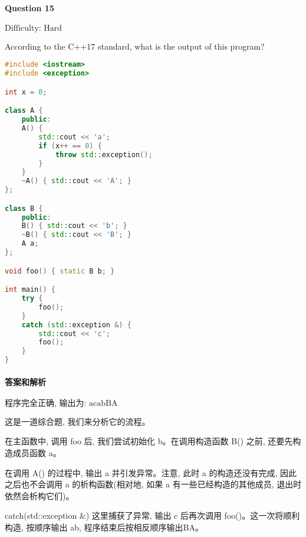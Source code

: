 \documentclass{article}
\begin{document}
	\paragraph*{Question 15} $\boxed{\text{Difficulty: Hard}} $			
	
	According to the C++17 standard, what is the output of this program?
	
	\begin{lstlisting}[language=C++]  		
#include <iostream>
#include <exception>

int x = 0;

class A {
	public:
	A() {
		std::cout << 'a';
		if (x++ == 0) {
			throw std::exception();
		}
	}
	~A() { std::cout << 'A'; }
};

class B {
	public:
	B() { std::cout << 'b'; }
	~B() { std::cout << 'B'; }
	A a;
};

void foo() { static B b; }

int main() {
	try {
		foo();
	}
	catch (std::exception &) {
		std::cout << 'c';
		foo();
	}
}
	\end{lstlisting}
	
	
	\paragraph*{答案和解析} $\boxed{\text{程序完全正确, 输出为: acabBA}} $
	
	这是一道综合题, 我们来分析它的流程。
	
	在主函数中, 调用 foo 后, 我们尝试初始化 b。在调用构造函数 B() 之前, 还要先构造成员函数 a。
	
	在调用 A() 的过程中, 输出 a 并引发异常。注意, 此时 a 的构造还没有完成, 因此之后也不会调用 a 的析构函数(相对地, 如果 a 有一些已经构造的其他成员, 退出时依然会析构它们)。
	
	catch(std::exception \&) 这里捕获了异常, 输出 c 后再次调用 foo()。这一次将顺利构造, 按顺序输出 ab, 程序结束后按相反顺序输出BA。
	
\end{document}
